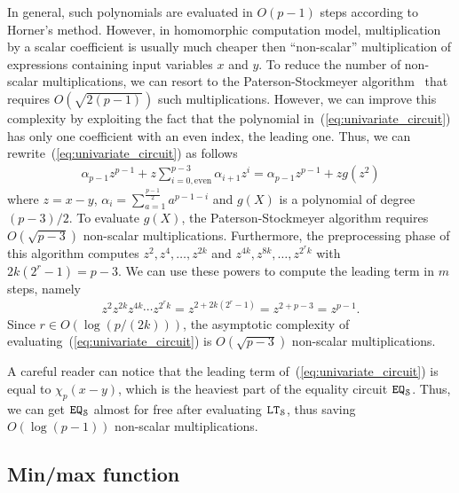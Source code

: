   In general, such polynomials are evaluated in $O(p-1)$ steps according to Horner's method.
  However, in homomorphic computation model, multiplication by a scalar coefficient is usually much cheaper then ``non-scalar'' multiplication of expressions containing input variables $x$ and $y$.
  To reduce the number of non-scalar multiplications, we can resort to the Paterson-Stockmeyer algorithm~\cite{SIAM:PS73} that requires $O(\sqrt{2(p-1)})$ such multiplications.
  However, we can improve this complexity by exploiting the fact that the polynomial in~(\ref{eq:univariate_circuit}) has only one coefficient with an even index, the leading one.
  Thus, we can rewrite~(\ref{eq:univariate_circuit}) as follows
  \begin{align*}
    \alpha_{p-1} z^{p-1} + z \sum_{i=0, \text{even}}^{p-3} \alpha_{i+1} z^i =  \alpha_{p-1} z^{p-1} + z g(z^2)
  \end{align*}
  where $z = x - y$, $\alpha_i = \sum_{a=1}^{\frac{p-1}{2}} a^{p-1-i}$ and $g(X)$ is a polynomial of degree $(p-3)/2$.
  To evaluate $g(X)$, the Paterson-Stockmeyer algorithm requires $O(\sqrt{p-3})$ non-scalar multiplications.
  Furthermore, the preprocessing phase of this algorithm computes $z^2, z^4, \dots, z^{2k}$ and $z^{4k}, z^{8k}, \dots, z^{2^r k}$ with $2k(2^r-1) = p-3$.
  We can use these powers to compute the leading term in $m$ steps, namely
  \begin{align*}
    z^2 z^{2k} z^{4k} \cdots z^{2^r k} = z^{2 + 2k(2^r-1)} = z^{2 + p - 3} = z^{p-1}.
  \end{align*}
  Since $r \in O(\log (p/(2k)))$, the asymptotic complexity of evaluating~(\ref{eq:univariate_circuit}) is $O(\sqrt{p-3})$ non-scalar multiplications.
  
  \begin{remark}
    A careful reader can notice that the leading term of~(\ref{eq:univariate_circuit}) is equal to $\chi_p(x-y)$, which is the heaviest part of the equality circuit $\mathtt{EQ}_{\mathcal{S}}$.
    Thus, we can get $\mathtt{EQ}_{\mathcal{S}}$ almost for free after evaluating $\mathtt{LT}_{\mathcal{S}}$, thus saving $O(\log (p-1))$ non-scalar multiplications.
  \end{remark}

\subsection{Min/max function}

